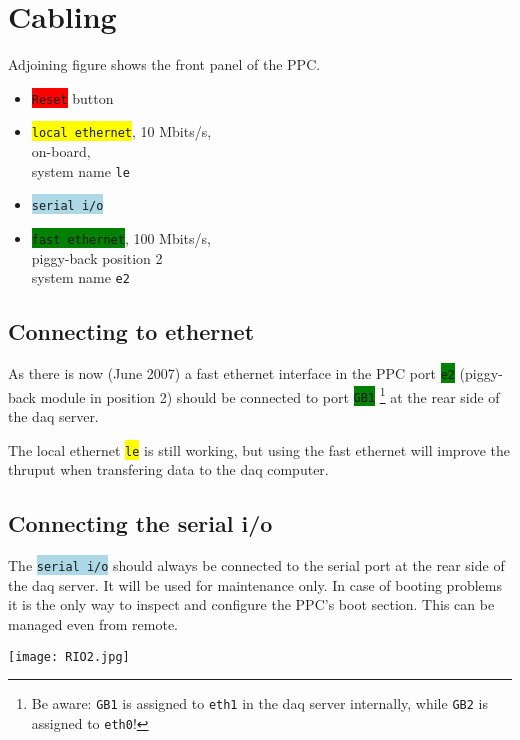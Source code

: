 \documentclass[10pt]{article}
\newcommand{\blue}[1]{\colorbox{lightblue}{\texttt{#1}}}
\newcommand{\yellow}[1]{\colorbox{yellow}{\texttt{#1}}}
\newcommand{\red}[1]{\colorbox{red}{\texttt{#1}}}
\newcommand{\green}[1]{\colorbox{green}{\texttt{#1}}}
\begin{document}
\section{Cabling}\label{Cabling}
\begin{minipage}[b]{.6\linewidth}
Adjoining figure shows the front panel of the PPC.
\begin{itemize}
\setlength{\rightmargin}{1em}%
\setlength{\leftmargin}{2em}%
\setlength{\itemsep}{0pt}%
\setlength{\parskip}{1mm}%
\setlength{\partopsep}{0pt}%
\setlength{\parsep}{0pt}%
\setlength{\topsep}{0pt}%
\item	\red{Reset} button
\item	\yellow{local ethernet}, 10 Mbits/s,\\
	on-board,\\
	system name \texttt{le}
\item	\blue{serial i/o}
\item	\green{fast ethernet}, 100 Mbits/s,\\
	piggy-back position 2\\
	system name \texttt{e2}
\end{itemize}

\subsection{Connecting to ethernet}
As there is now (June 2007) a fast ethernet interface in the PPC port \green{e2} (piggy-back module in position 2) should be connected to port \green{GB1}
\footnote{Be aware: \texttt{GB1} is assigned to \texttt{eth1} in the daq server internally, while \texttt{GB2} is assigned to \texttt{eth0}!}
at the rear side of the daq server.

The local ethernet \yellow{le} is still working, but using the fast ethernet will improve the thruput when
transfering data to the daq computer.
\subsection{Connecting the serial i/o}
The \blue{serial i/o} should always be connected to the serial port at the rear side of the daq server.
It will be used for maintenance only. In case of booting problems it is the only way to inspect and
configure the PPC's boot section. This can be managed even from remote.
\end{minipage}
\begin{minipage}[b]{.3\linewidth}
\texttt{[image: RIO2.jpg]}
\end{minipage}
\newpage
\end{document}
